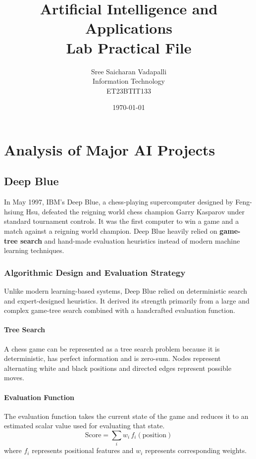 \documentclass[12pt,a4paper]{report}
\begin{document}
\title{\Huge Artificial Intelligence and Applications \\ Lab Practical File}
\author{\Large Sree Saicharan Vadapalli \\ Information Technology \\ ET23BTIT133}
\date{\today}
\maketitle
\newpage

\tableofcontents
\newpage
\renewcommand{\chaptername}{Practical}

\chapter{Analysis of Major AI Projects}
\section{Deep Blue}
In May 1997, IBM's Deep Blue, a chess-playing supercomputer designed by Feng-hsiung Hsu, defeated the reigning world chess champion Garry Kasparov under standard tournament controls. It was the first computer to win a game and a match against a reigning world champion. Deep Blue heavily relied on \textbf{game-tree search} and hand-made evaluation heuristics instead of modern machine learning techniques.

\subsection{Algorithmic Design and Evaluation Strategy}
Unlike modern learning-based systems, Deep Blue relied on deterministic search and expert-designed heuristics. It derived its strength primarily from a large and complex game-tree search combined with a handcrafted evaluation function.

\subsubsection{Tree Search}
A chess game can be represented as a tree search problem because it is deterministic, has perfect information and is zero-sum. Nodes represent alternating white and black positions and directed edges represent possible moves.

\subsubsection{Evaluation Function}
The evaluation function takes the current state of the game and reduces it to an estimated scalar value used for evaluating that state.
\[
\text{Score} = \sum_{i} w_i \, f_i(\text{position})
\]
where $f_i$ represents positional features and $w_i$ represents corresponding weights.
\end{document}
